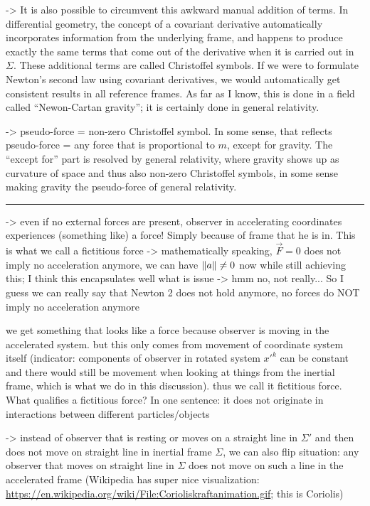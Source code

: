 \documentclass[../class_mech_main.tex]{subfiles}
\begin{document}
->  It is also possible to circumvent this awkward manual addition of terms. In differential geometry, the concept of a covariant derivative automatically incorporates information from the underlying frame, and happens to produce exactly the same terms that come out of the derivative when it is carried out in $\Sigma$. These additional terms are called Christoffel symbols. If we were to formulate Newton's second law using covariant derivatives, we would automatically get consistent results in all reference frames. As far as I know, this is done in a field called \enquote{Newon-Cartan gravity}; it is certainly done in general relativity.


-> pseudo-force = non-zero Christoffel symbol. In some sense, that reflects pseudo-force = any force that is proportional to $m$, except for gravity. The \enquote{except for} part is resolved by general relativity, where gravity shows up as curvature of space and thus also non-zero Christoffel symbols, in some sense making gravity the pseudo-force of general relativity.


\hrule


-> even if no external forces are present, observer in accelerating coordinates experiences (something like) a force! Simply because of frame that he is in. This is what we call a fictitious force -> mathematically speaking, $\vec{F} = 0$ does not imply no acceleration anymore, we can have $\norm{a} \neq 0$ now while still achieving this; I think this encapsulates well what is issue -> hmm no, not really... So I guess we can really say that Newton 2 does not hold anymore, no forces do NOT imply no acceleration anymore


we get something that looks like a force because observer is moving in the accelerated system. but this only comes from movement of coordinate system itself (indicator: components of observer in rotated system $x'^k$ can be constant and there would still be movement when looking at things from the inertial frame, which is what we do in this discussion). thus we call it fictitious force. What qualifies a fictitious force? In one sentence: it does not originate in interactions between different particles/objects


-> instead of observer that is resting or moves on a straight line in $\Sigma'$ and then does not move on straight line in inertial frame $\Sigma$, we can also flip situation: any observer that moves on straight line in $\Sigma$ does not move on such a line in the accelerated frame (Wikipedia has super nice visualization: \url{https://en.wikipedia.org/wiki/File:Corioliskraftanimation.gif}; this is Coriolis)
\end{document}
